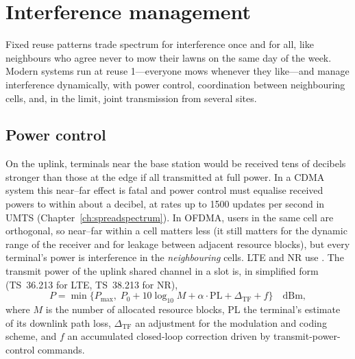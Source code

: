\section{Interference management}
\label{sec:ch20:interference}

Fixed reuse patterns trade spectrum for interference once and for all, like neighbours who agree never to mow
their lawns on the same day of the week. Modern systems run at reuse 1---everyone mows whenever they like---and
manage interference dynamically, with power control, coordination between neighbouring cells, and, in the limit,
joint transmission from several sites.


\subsection{Power control}

On the uplink, terminals near the base station would be received tens of decibels stronger than those at the edge
if all transmitted at full power. In a CDMA system this near--far effect is fatal and power control must equalise
received powers to within about a decibel, at rates up to 1500 updates per second in UMTS
(Chapter~\ref{ch:spreadspectrum}). In OFDMA, users in the same cell are orthogonal, so near--far within a cell
matters less (it still matters for the dynamic range of the receiver and for leakage between adjacent resource
blocks), but every terminal's power is interference in the \emph{neighbouring} cells. LTE and NR use
. The transmit power of the uplink shared channel in a slot is, in simplified form
(TS~36.213 for LTE, TS~38.213 for NR),
\begin{equation}
P=\min\Big\{P_{\max},\;P_0+10\log_{10}M+\alpha\cdot\mathrm{PL}+\Delta_{\mathrm{TF}}+f\Big\}\quad\text{dBm},
\label{eq:ch20:fpc}
\end{equation}
where $M$ is the number of allocated resource blocks, PL the terminal's estimate of its downlink path loss,
$\Delta_{\mathrm{TF}}$ an adjustment for the modulation and coding scheme, and $f$ an accumulated closed-loop
correction driven by transmit-power-control commands.

